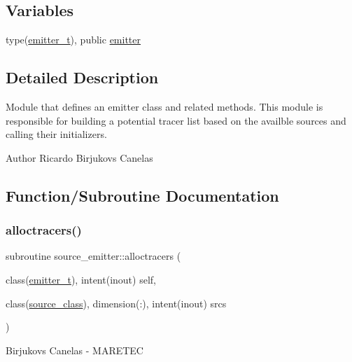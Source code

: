 \subsection*{Variables}
\begin{DoxyCompactItemize}
\item 
type(\hyperlink{structsource__emitter_1_1emitter__t}{emitter\+\_\+t}), public \hyperlink{namespacesource__emitter_a357876a84a74e23c44e92ab8ef7dc35e}{emitter}
\end{DoxyCompactItemize}


\subsection{Detailed Description}
Module that defines an emitter class and related methods. This module is responsible for building a potential tracer list based on the availble sources and calling their initializers. 

\begin{DoxyAuthor}{Author}
Ricardo Birjukovs Canelas 
\end{DoxyAuthor}


\subsection{Function/\+Subroutine Documentation}
\mbox{\label{namespacesource__emitter_a54e88b7aa868ff9de8cf018208a20585}} 
\subsubsection{\texorpdfstring{alloctracers()}{alloctracers()}}
{\footnotesize\ttfamily subroutine source\+\_\+emitter\+::alloctracers (\begin{DoxyParamCaption}\item[{class(\hyperlink{structsource__emitter_1_1emitter__t}{emitter\+\_\+t}), intent(inout)}]{self,  }\item[{class(\hyperlink{structsource__identity_1_1source__class}{source\+\_\+class}), dimension(\+:), intent(inout)}]{srcs }\end{DoxyParamCaption})\hspace{0.3cm}{\ttfamily [private]}}



Birjukovs Canelas -\/ M\+A\+R\+E\+T\+EC 

